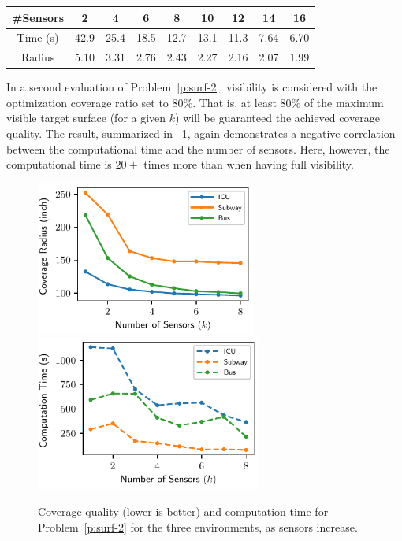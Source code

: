 \vspace{1mm}
\begin{table}[!ht]
    \centering
    \begin{tabular}{|c|c|c|c|c|c|c|c|c|}
    \hline
        \#Sensors   & 2     &  4    & 6      & 8     & 10    & 12    & 14    & 16 \\
        \hline
        Time (s)    & 42.9   &  25.4    & 18.5  & 12.7 & 13.1  & 11.3  & 7.64 & 6.70 \\ 
        \hline
        Radius  & 5.10     &  3.31    & 2.76      & 2.43     & 2.27    & 2.16    & 2.07    & 1.99 \\
        \hline
    \end{tabular}
    \label{tab:Terrain}
\end{table}

In a second evaluation of Problem~\ref{p:surf-2}, visibility is considered with the 
optimization coverage ratio set to $80\%$. That is, at least $80\%$ of the
maximum visible target surface (for a given $k$) will be guaranteed the achieved coverage 
quality. The result, summarized in ~\ref{fig:surf-coverage-ratio-mq}, again 
demonstrates a negative correlation between the computational time and the number 
of sensors. Here, however, the computational time is $20+$ times  more 
than when having full visibility.

\begin{figure}[!ht]
    \centering
    \includegraphics[width=.46\columnwidth, height=2in]{chapters/surf/fig/result-radius-mq-eps-converted-to.pdf}
    \includegraphics[width=.46\columnwidth, height=2in]{chapters/surf/fig/result-time-mq-eps-converted-to.pdf}
    \caption{Coverage quality (lower is better) and computation time for Problem~\ref{p:surf-2}
    for the three environments, as sensors increase.}
    \label{fig:surf-coverage-ratio-mq}
\end{figure}

